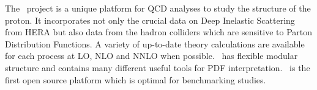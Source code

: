 
The \fitter\ project is a unique platform for QCD analyses to study the 
structure of the proton. It incorporates not only the crucial data on
Deep Inelastic Scattering from HERA but also data from the hadron colliders 
which are sensitive to Parton Distribution Functions. A variety of up-to-date 
theory calculations are available for each process at LO, NLO and NNLO 
when possible.  
\fitter\ has flexible modular structure and contains many different useful tools for PDF interpretation. 
\fitter\ is the first open source platform which is optimal for benchmarking studies.

